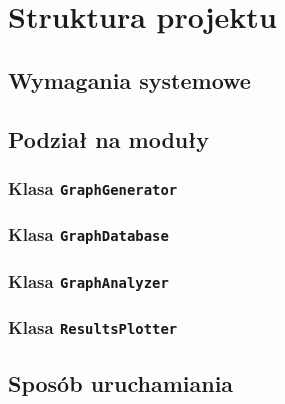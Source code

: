 
\section{Struktura projektu}
	\label{final:struktura}

	\subsection{Wymagania systemowe}
		\label{final:struktura:wymagania}


	\subsection{Podział na moduły}
		\label{final:struktura:klasy}



		\subsubsection{Klasa \texttt{GraphGenerator}}
		\subsubsection{Klasa \texttt{GraphDatabase}}
		\subsubsection{Klasa \texttt{GraphAnalyzer}}
		\subsubsection{Klasa \texttt{ResultsPlotter}}

	\subsection{Sposób uruchamiania}
		\label{final:struktura:uruchamianie}

